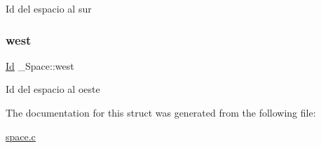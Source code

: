 Id del espacio al sur \mbox{\label{struct__Space_a20c1d259e93b44e24ba82982e142eb9b}} 
\subsubsection{\texorpdfstring{west}{west}}
{\footnotesize\ttfamily \hyperlink{types_8h_a845e604fb28f7e3d97549da3448149d3}{Id} \+\_\+\+Space\+::west}

Id del espacio al oeste 

The documentation for this struct was generated from the following file\+:\begin{DoxyCompactItemize}
\item 
\hyperlink{space_8c}{space.\+c}\end{DoxyCompactItemize}
